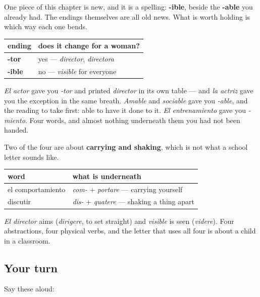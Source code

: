 \begin{grammarlens}[title={Grammar Lens: three endings you already had}]
One piece of this chapter is new, and it is a spelling: \textbf{-ible}, beside the \textbf{-able} you already had. The endings themselves are all old news. What is worth holding is which way each one bends.

\noindent
\begin{tabularx}{\linewidth}{@{}>{\raggedright\arraybackslash}X>{\raggedright\arraybackslash}X@{}}
\toprule
\textbf{ending} & \textbf{does it change for a woman?} \\
\midrule
\textbf{-tor} & yes — \emph{director}, \emph{directora} \\
\textbf{-ible} & no — \emph{visible} for everyone \\
\bottomrule
\end{tabularx}

\emph{El actor} gave you \emph{-tor} and printed \emph{director} in its own table — and \emph{la actriz} gave you the exception in the same breath. \emph{Amable} and \emph{sociable} gave you \emph{-able}, and the reading to take first: able to have it done to it. \emph{El entrenamiento} gave you \emph{-miento}. Four words, and almost nothing underneath them you had not been handed.
\end{grammarlens}

\begin{cousinweb}
Two of the four are about \textbf{carrying and shaking}, which is not what a school letter sounds like.

\noindent
\begin{tabularx}{\linewidth}{@{}>{\raggedright\arraybackslash}X>{\raggedright\arraybackslash}X@{}}
\toprule
\textbf{word} & \textbf{what is underneath} \\
\midrule
el comportamiento & \emph{com-} + \emph{portare} — carrying yourself \\
discutir & \emph{dis-} + \emph{quatere} — shaking a thing apart \\
\bottomrule
\end{tabularx}

\emph{El director} aims (\emph{dirigere}, to set straight) and \emph{visible} is seen (\emph{videre}). Four abstractions, four physical verbs, and the letter that uses all four is about a child in a classroom.
\end{cousinweb}

\subsection*{Your turn}
Say these aloud:

